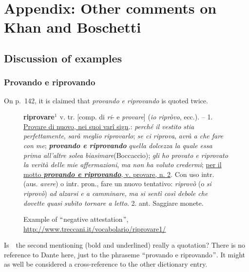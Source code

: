 \documentclass[10pt]{article}
\begin{document}
\newpage
\section*{Appendix: Other comments on Khan and Boschetti }
\subsection*{Discussion of examples}



\subsubsection*{Provando e riprovando}



 On p.~142, it is claimed that \textit{provando e riprovando} is quoted twice. \par


\begin{figure}[H]
 \textbf{\textcolor[HTML]{3E3F3E}{riprovare$^1$ }}\textcolor[HTML]{3E3F3E}{ v. tr. [comp. di \textit{ri}- e \textit{provare}] (\textit{io ripròvo}, ecc.). – 1. \uline{Provare di nuovo, nei suoi varî sign}.: \textit{perché il vestito stia perfettamente}, \textit{sarà meglio riprovarlo}; \textit{se ci riprova}, \textit{avrà a che fare con me}; \textbf{\textit{provando e riprovando}}\textit{ quella dolcezza la quale essa prima all’altre solea biasimare}(Boccaccio); \textit{gli ho provato e riprovato la verità delle mie affermazioni}, \textit{ma non ha voluto credermi}; \uline{per il motto \textbf{\textit{provando e riprovando}}, v. provare, n. 2}. Con uso intr. (aus. \textit{avere}) o intr. pron., fare un nuovo tentativo: \textit{riprovò} (o \textit{si riprovò}) \textit{ad alzarsi e a camminare}, \textit{ma si sentì così debole che dovette quasi subito tornare a letto}. 2. ant. Saggiare monete.}\par

 \caption{Example of $``$negative attestation$"$, \textcolor[HTML]{3E3F3E}{\href{http://www.treccani.it/vocabolario/riprovare1/}{\uline{http://www.treccani.it/vocabolario/riprovare1/}}}}

\end{figure}

 Is\ \ the second mentioning (bold and underlined)  really a quotation? There is no reference to Dante here, just to the phraseme $``$provando e riprovando$"$. It might as well be considered a cross-reference to the other dictionary entry.\par
\end{document}
